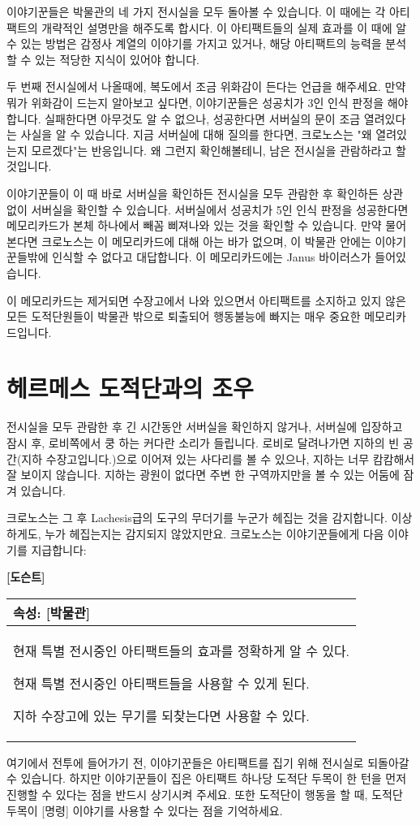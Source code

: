\documentclass[12pt]{report}
\newenvironment{story}[2]
{\begin{center}
		{\large \textbf{[#1]}}\\[1ex]
		\begin{tabular}{|p{\textwidth}|}
			\hline
			\textbf{속성}: #2
			\\
			\hline
		}
		{
			\\\hline
		\end{tabular}
	\end{center}
}
\begin{document}
		이야기꾼들은 박물관의 네 가지 전시실을 모두 돌아볼 수 있습니다. 이 때에는 각 아티팩트의 개략적인 설명만을 해주도록 합시다. 이 아티팩트들의 실제 효과를 이 때에 알 수 있는 방법은 감정사 계열의 이야기를 가지고 있거나, 해당 아티팩트의 능력을 분석할 수 있는 적당한 지식이 있어야 합니다.
		
		두 번째 전시실에서 나올때에, 복도에서 조금 위화감이 든다는 언급을 해주세요. 만약 뭐가 위화감이 드는지 알아보고 싶다면, 이야기꾼들은 성공치가 3인 인식 판정을 해야합니다. 실패한다면 아무것도 알 수 없으나, 성공한다면 서버실의 문이 조금 열려있다는 사실을 알 수 있습니다. 지금 서버실에 대해 질의를 한다면, 크로노스는 "왜 열려있는지 모르겠다"는 반응입니다. 왜 그런지 확인해볼테니, 남은 전시실을 관람하라고 할 것입니다.
		
		이야기꾼들이 이 때 바로 서버실을 확인하든 전시실을 모두 관람한 후 확인하든 상관 없이 서버실을 확인할 수 있습니다. 서버실에서 성공치가 5인 인식 판정을 성공한다면 메모리카드가 본체 하나에서 빼꼼 삐져나와 있는 것을 확인할 수 있습니다. 만약 물어본다면 크로노스는 이 메모리카드에 대해 아는 바가 없으며, 이 박물관 안에는 이야기꾼들밖에 인식할 수 없다고 대답합니다. 이 메모리카드에는 Janus 바이러스가 들어있습니다.
		
		이 메모리카드는 제거되면 수장고에서 나와 있으면서 아티팩트를 소지하고 있지 않은 모든 도적단원들이 박물관 밖으로 퇴출되어 행동불능에 빠지는 매우 중요한 메모리카드입니다.
	
	\section*{헤르메스 도적단과의 조우}
		전시실을 모두 관람한 후 긴 시간동안 서버실을 확인하지 않거나, 서버실에 입장하고 잠시 후, 로비쪽에서 쿵 하는 커다란 소리가 들립니다. 로비로 달려나가면 지하의 빈 공간(지하 수장고입니다.)으로 이어져 있는 사다리를 볼 수 있으나, 지하는 너무 캄캄해서 잘 보이지 않습니다. 지하는 광원이 없다면 주변 한 구역까지만을 볼 수 있는 어둠에 잠겨 있습니다.
		
		크로노스는 그 후 Lachesis급의 도구의 무더기를 누군가 헤집는 것을 감지합니다. 이상하게도, 누가 헤집는지는 감지되지 않았지만요. 크로노스는 이야기꾼들에게 다음 이야기를 지급합니다:
		\begin{story}{도슨트}{[박물관]}
			현재 특별 전시중인 아티팩트들의 효과를 정확하게 알 수 있다.
			
			현재 특별 전시중인 아티팩트들을 사용할 수 있게 된다.
			
			지하 수장고에 있는 무기를 되찾는다면 사용할 수 있다.
		\end{story}
		여기에서 전투에 들어가기 전, 이야기꾼들은 아티팩트를 집기 위해 전시실로 되돌아갈 수 있습니다. 하지만 이야기꾼들이 집은 아티팩트 하나당 도적단 두목이 한 턴을 먼저 진행할 수 있다는 점을 반드시 상기시켜 주세요. 또한 도적단이 행동을 할 때, 도적단 두목이 [명령] 이야기를 사용할 수 있다는 점을 기억하세요.
	
\end{document}
